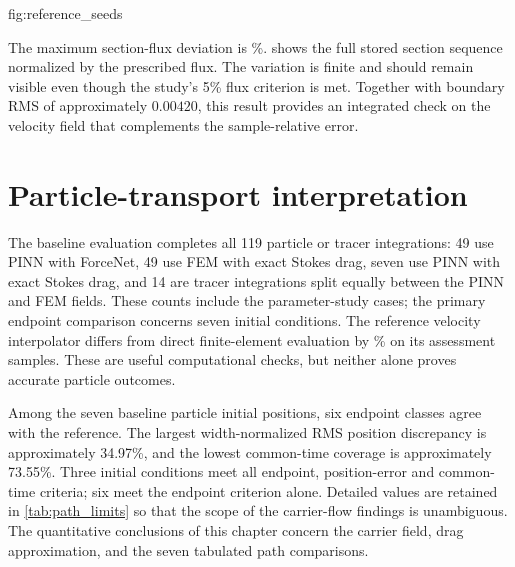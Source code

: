 {fig:reference_seeds}

The maximum section-flux deviation is \FluxDeviation\%.
 shows the full stored section sequence normalized by the
prescribed flux. The variation is finite and should remain visible even
though the study's 5\% flux criterion is met. Together with boundary RMS
of approximately $0.00420$, this result provides an integrated check on
the velocity field that complements the sample-relative error.


\section{Particle-transport interpretation}
The baseline evaluation completes all 119 particle or tracer integrations:
49 use PINN with ForceNet, 49 use
FEM with exact Stokes drag, seven use PINN with exact Stokes drag, and
14 are tracer integrations split equally between the PINN and FEM fields.
These counts include the parameter-study cases; the primary endpoint
comparison concerns seven initial conditions. The reference velocity
interpolator differs from direct finite-element evaluation by
\InterpolationDifference\% on its assessment samples. These are useful
computational checks, but neither alone proves accurate particle outcomes.

Among the seven baseline particle initial positions, six endpoint classes
agree with the reference. The largest width-normalized RMS position
discrepancy is approximately 34.97\%, and the lowest common-time coverage
is approximately 73.55\%. Three initial conditions meet all endpoint,
position-error and common-time criteria; six meet the endpoint criterion
alone. Detailed values are retained in
\cref{tab:path_limits} so that the scope of the carrier-flow findings is
unambiguous. The quantitative conclusions of this chapter concern the
carrier field, drag approximation, and the seven tabulated path comparisons.

